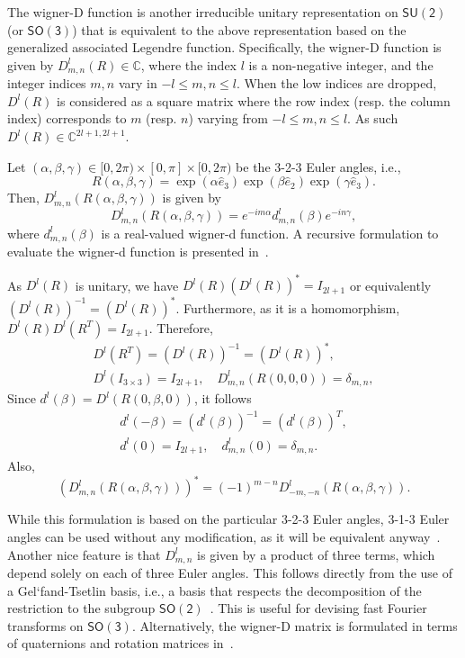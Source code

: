 \documentclass{ieeetran}
\newcommand{\SO}{\ensuremath{\mathsf{SO(3)}}}
\newcommand{\Cp}{\ensuremath{\mathbb{C}}}
\begin{document}
The wigner-D function is another irreducible unitary representation on $\mathsf{SU(2)}$ (or $\SO$) that is equivalent to the above representation based on the generalized associated Legendre function. Specifically, the wigner-D function is given by $D^l_{m,n}(R)\in\Cp$, where the index $l$ is a non-negative integer, and the integer indices $m,n$ vary in $-l\leq m,n \leq l$. When the low indices are dropped, $D^l(R)$ is considered as a square matrix where the row index (resp. the column index) corresponds to $m$ (resp. $n$) varying from $-l\leq m,n \leq l$. As such $D^l(R)\in\Cp^{2l+1,2l+1}$.

Let $(\alpha,\beta,\gamma)\in[0,2\pi)\times[0,\pi]\times[0,2\pi)$ be the 3-2-3 Euler angles, i.e., 
\[
R(\alpha,\beta,\gamma)=\exp(\alpha\hat e_3)\exp(\beta\hat e_2)\exp(\gamma\hat e_3). 
\]
Then, $D^l_{m,n}(R(\alpha,\beta,\gamma))$ is given by
\[
D^l_{m,n}(R(\alpha,\beta,\gamma)) = e^{-i m\alpha} d^l_{m,n}(\beta) e^{-i n\gamma},
\]
where $d^l_{m,n}(\beta)$ is a real-valued wigner-d function. A recursive formulation to evaluate the wigner-d function is presented in~\cite{BlaFloJMS97}. 

As $D^l(R)$ is unitary, we have $D^l(R)(D^{l}(R))^*=I_{2l+1}$ or equivalently $(D^l(R))^{-1}=(D^l(R))^*$. Furthermore, as it is a homomorphism, $D^l(R)D^l(R^T)=I_{2l+1}$. Therefore,
\begin{gather*}
D^l(R^T) = (D^l(R))^{-1} = (D^l(R))^*,\\
D^l(I_{3\times 3}) =I_{2l+1},\quad
D^l_{m,n}(R(0,0,0))=\delta_{m,n},
\end{gather*}
Since $d^l(\beta)=D^l(R(0,\beta,0))$, it follows
\begin{gather*}
d^l(-\beta) = (d^l(\beta))^{-1} = (d^l(\beta))^T,\\
d^l(0)=I_{2l+1},\quad d^l_{m,n}(0)=\delta_{m,n}.
\end{gather*}
Also,
\[
(D^l_{m,n}(R(\alpha,\beta,\gamma)))^*=(-1)^{m-n} D^l_{-m,-n}(R(\alpha,\beta,\gamma)).
\]

While this formulation is based on the particular 3-2-3 Euler angles, 3-1-3 Euler angles can be used without any modification, as it will be equivalent anyway~\cite{ChiKya01}. Another nice feature is that $D^l_{m,n}$ is given by a product of three terms, which depend solely on each of three Euler angles. This follows directly from the use of a Gel`fand-Tsetlin basis, i.e., a basis that respects the decomposition of the restriction to the subgroup $\mathsf{SO(2)}$~\cite{MasRocGC97}. This is useful for devising fast Fourier transforms on $\SO$. Alternatively, the wigner-D matrix is formulated in terms of quaternions and rotation matrices in~\cite{LynStoMS89}.
\end{document}
